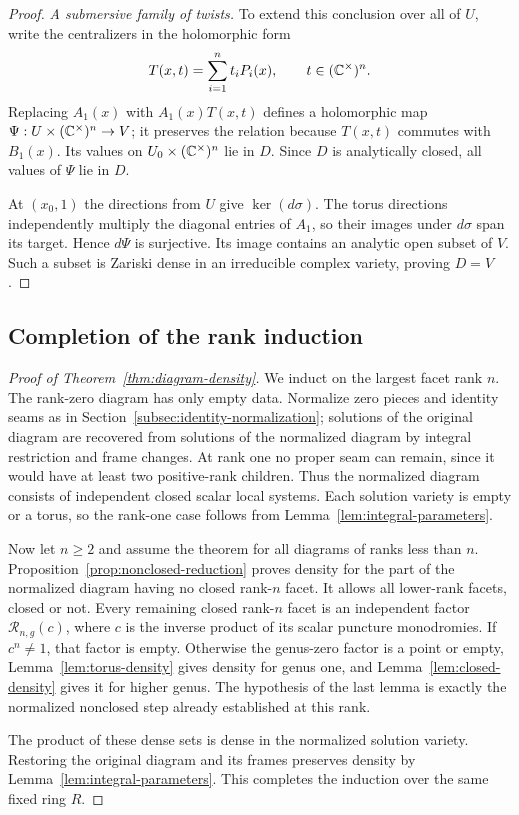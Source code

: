 \begin{proof}
\smallskip\noindent\emph{A submersive family of twists.}
To extend this conclusion over all of $U$, write the centralizers in
the holomorphic form
\[
       T(x,t)=\sum_{i=1}^n t_iP_i(x),
       \qquad t\in(\mathbb C^\times)^n.
\]
Replacing $A_1(x)$ with $A_1(x)T(x,t)$ defines a holomorphic map
$\Psi:U\times(\mathbb C^\times)^n\to V$; it preserves the relation because
$T(x,t)$ commutes with $B_1(x)$.  Its values on
$U_0\times(\mathbb C^\times)^n$ lie in $D$.  Since $D$ is analytically
closed, all values of $\Psi$ lie in $D$.

At $(x_0,1)$ the directions from $U$ give $\ker(d\sigma)$.
The torus directions independently multiply the diagonal entries of
$A_1$, so their images under $d\sigma$ span its target.  Hence
$d\Psi$ is surjective.  Its image contains an analytic open subset of
$V$.  Such a subset is Zariski dense in an irreducible complex
variety, proving $D=V$.
\end{proof}

\subsection{Completion of the rank induction}

\begin{proof}[Proof of Theorem~\ref{thm:diagram-density}]
We induct on the largest facet rank $n$. The rank-zero diagram has
only empty data. Normalize zero pieces and identity seams as in
Section~\ref{subsec:identity-normalization}; solutions of the original
diagram are recovered from solutions of the normalized diagram by
integral restriction and frame changes. At rank one no proper seam
can remain, since it would have at least two positive-rank children.
Thus the normalized diagram consists of independent closed scalar
local systems. Each solution variety is empty or a torus, so the
rank-one case follows from Lemma~\ref{lem:integral-parameters}.

Now let $n\geq2$ and assume the theorem for all diagrams of ranks
less than $n$. Proposition~\ref{prop:nonclosed-reduction} proves
density for the part of the normalized diagram having no closed
rank-$n$ facet. It allows all lower-rank facets, closed or not.
Every remaining closed rank-$n$ facet is an independent factor
$\mathcal R_{n,g}(c)$, where $c$ is the inverse product of its scalar
puncture monodromies. If $c^n\ne1$, that factor is empty. Otherwise
the genus-zero factor is a point or empty,
Lemma~\ref{lem:torus-density} gives density for genus one, and
Lemma~\ref{lem:closed-density} gives it for higher genus. The
hypothesis of the last lemma is exactly the normalized nonclosed
step already established at this rank.

The product of these dense sets is dense in the normalized solution
variety. Restoring the original diagram and its frames preserves
density by Lemma~\ref{lem:integral-parameters}. This completes the
induction over the same fixed ring $R$.
\end{proof}
